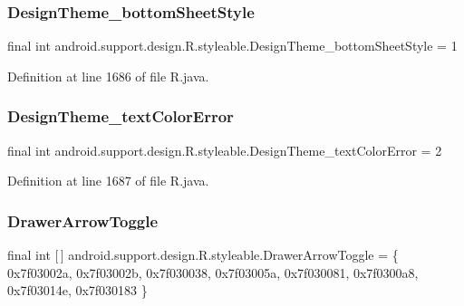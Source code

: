 \subsubsection{\texorpdfstring{DesignTheme\_bottomSheetStyle}{DesignTheme\_bottomSheetStyle}}
{\footnotesize\ttfamily final int android.\+support.\+design.\+R.\+styleable.\+Design\+Theme\+\_\+bottom\+Sheet\+Style = 1\hspace{0.3cm}{\ttfamily [static]}}



Definition at line 1686 of file R.\+java.

\mbox{\label{classandroid_1_1support_1_1design_1_1_r_1_1styleable_a02c6796a896b6c3f54682cd0a906312f}} 
\subsubsection{\texorpdfstring{DesignTheme\_textColorError}{DesignTheme\_textColorError}}
{\footnotesize\ttfamily final int android.\+support.\+design.\+R.\+styleable.\+Design\+Theme\+\_\+text\+Color\+Error = 2\hspace{0.3cm}{\ttfamily [static]}}



Definition at line 1687 of file R.\+java.

\mbox{\label{classandroid_1_1support_1_1design_1_1_r_1_1styleable_a559d22c78738e5161420dc4b41689c1b}} 
\subsubsection{\texorpdfstring{DrawerArrowToggle}{DrawerArrowToggle}}
{\footnotesize\ttfamily final int \mbox{[}$\,$\mbox{]} android.\+support.\+design.\+R.\+styleable.\+Drawer\+Arrow\+Toggle = \{ 0x7f03002a, 0x7f03002b, 0x7f030038, 0x7f03005a, 0x7f030081, 0x7f0300a8, 0x7f03014e, 0x7f030183 \}\hspace{0.3cm}{\ttfamily [static]}}



